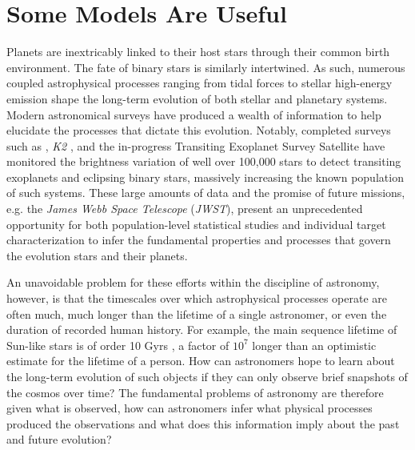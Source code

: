
\section{Some Models Are Useful}

Planets are inextricably linked to their host stars through their common birth environment. The fate of binary stars is similarly intertwined.  As such, numerous coupled astrophysical processes ranging from tidal forces \citep{Zahn1989,Barnes2017} to stellar high-energy emission \citep{Airapetian2019} shape the long-term evolution of both stellar and planetary systems. Modern astronomical surveys have produced a wealth of information to help elucidate the processes that dictate this evolution. Notably, completed surveys such as \kepler \citep{Borucki2003,Borucki2010}, \textit{K2} \citep{Howell2014}, and the in-progress Transiting Exoplanet Survey Satellite \citep[\textit{TESS}, ][]{Ricker2014} have monitored the brightness variation of well over 100,000 stars to detect transiting exoplanets and eclipsing binary stars, massively increasing the known population of such systems.  These large amounts of data and the promise of future missions, e.g. the \textit{James Webb Space Telescope} (\textit{JWST}), present an unprecedented opportunity for both population-level statistical studies and individual target characterization to infer the fundamental properties and processes that govern the evolution stars and their planets.

An unavoidable problem for these efforts within the discipline of astronomy, however, is that the timescales over which astrophysical processes operate are often much, much longer than the lifetime of a single astronomer, or even the duration of recorded human history. For example, the main sequence lifetime of Sun-like stars is of order 10 Gyrs \citep{Baraffe2015}, a factor of $10^7$ longer than an optimistic estimate for the lifetime of a person. How can astronomers hope to learn about the long-term evolution of such objects if they can only observe brief snapshots of the cosmos over time? The fundamental problems of astronomy are therefore given what is observed, how can astronomers infer what physical processes produced the observations and what does this information imply about the past and future evolution? 

